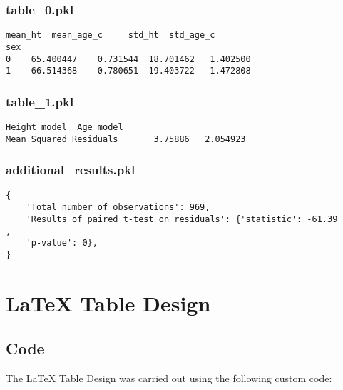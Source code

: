 \documentclass[11pt]{article}
\begin{document}
\subsubsection*{table\_0.pkl}

\begin{Verbatim}[tabsize=4]
       mean_ht  mean_age_c     std_ht  std_age_c
sex
0    65.400447    0.731544  18.701462   1.402500
1    66.514368    0.780651  19.403722   1.472808
\end{Verbatim}

\subsubsection*{table\_1.pkl}

\begin{Verbatim}[tabsize=4]
                        Height model  Age model
Mean Squared Residuals       3.75886   2.054923
\end{Verbatim}

\subsubsection*{additional\_results.pkl}

\begin{Verbatim}[tabsize=4]
{
    'Total number of observations': 969,
    'Results of paired t-test on residuals': {'statistic': -61.39             ,
	'p-value': 0},
}
\end{Verbatim}

\section{LaTeX Table Design}
\subsection{{Code}}
The LaTeX Table Design was carried out using the following custom code:
\end{document}
